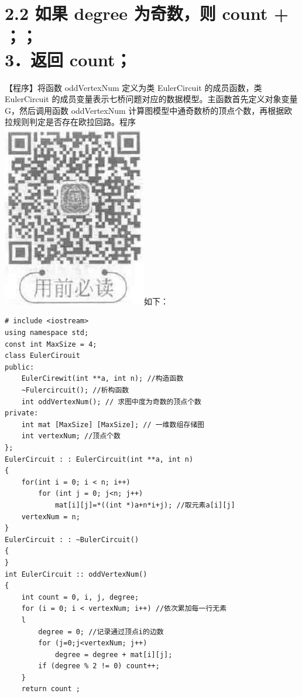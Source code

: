 \documentclass[10pt]{article}
\begin{document}
\section*{2.2 如果 degree 为奇数，则 count + ；； \\
 3．返回 count；}
【程序】将函数 oddVertexNum 定义为类 EulerCircuit 的成员函数，类 EulerCircuit 的成员变量表示七桥问题对应的数据模型。主函数首先定义对象变量 G，然后调用函数 oddVertexNum 计算图模型中通奇数桥的顶点个数，再根据欧拉规则判定是否存在欧拉回路。程序\\
\includegraphics[max width=\textwidth]{2025_06_06_704745ea57b15b2333e5g-017}如下：

\begin{verbatim}
# include <iostream>
using namespace std;
const int MaxSize = 4;
class EulerCirouit
public:
    EulerCirewit(int **a, int n); //构造函数
    ~Fulercircuit(); //析构函数
    int oddVertexNum(); // 求图中度为奇数的顶点个数
private:
    int mat [MaxSize] [MaxSize]; // 一维数组存储图
    int vertexNum; //顶点个数
};
EulerCircuit : : EulerCircuit(int **a, int n)
{
    for(int i = 0; i < n; i++)
        for (int j = 0; j<n; j++)
            mat[i][j]=*((int *)a+n*i+j); //取元素a[i][j]
    vertexNum = n;
}
EulerCircuit : : ~BulerCircuit()
{
}
int EulerCircuit :: oddVertexNum()
{
    int count = 0, i, j, degree;
    for (i = 0; i < vertexNum; i++) //依次累加每一行无素
    l
        degree = 0; //记录通过顶点i的边数
        for (j=0;j<vertexNum; j++)
            degree = degree + mat[i][j];
        if (degree % 2 != 0) count++;
    }
    return count ;
\end{verbatim}
\end{document}
